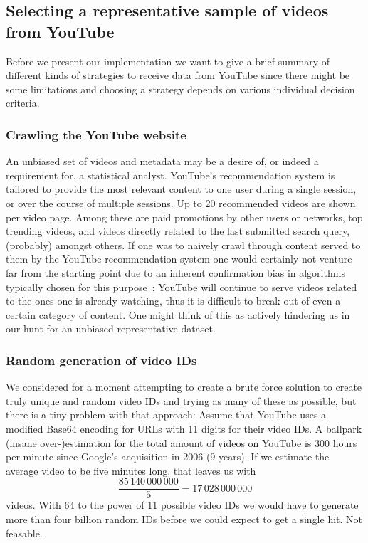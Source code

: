 \subsection{Selecting a representative sample of videos from YouTube}


Before we present our implementation we want to give a brief summary of
different kinds of strategies to receive data from YouTube since there might be
some limitations and choosing a strategy depends on various individual decision
criteria.

\subsubsection{Crawling the YouTube website}
An unbiased set of videos and metadata may be a desire of, or indeed a
requirement for, a statistical analyst. YouTube's recommendation system is
tailored to provide the most relevant content to one user during a single
session, or over the course of multiple sessions. Up to 20 recommended videos are shown per video page. Among these are paid
promotions by other users or networks, top trending videos, and videos directly related to the last
submitted search query, (probably) amongst others. If one was to naively crawl
through content served to them by the YouTube recommendation system one would
certainly not venture far from the starting point due to an inherent
confirmation bias in algorithms typically chosen for this
purpose~\cite{youtube-recommendation-system}: YouTube will
continue to serve videos related to the ones one is already watching, thus it is
difficult to break out of even a certain category of content. One might think of
this as actively hindering us in our hunt for an unbiased representative dataset.

\subsubsection{Random generation of video IDs}
We considered for a moment attempting to create a brute force solution to
create truly unique and random video IDs and trying as many of these as
possible, but there is a tiny problem with that approach:
Assume that YouTube uses a modified Base64 encoding for URLs with 11 digits
for their video IDs. A ballpark (insane over-)estimation for the total amount of videos on
YouTube is 300 hours per minute since Google's acquisition in 2006 (9 years).
If we estimate the average video to be five minutes long, that leaves us with
\[\frac{85\,140\,000\,000}{5} = 17\,028\,000\,000\] videos. With 64 to the power
of 11 possible video IDs we would have to generate more than four billion random
IDs before we could expect to get a single hit. Not feasable.

